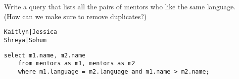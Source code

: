 \begin{blocksection}
\question Write a query that lists all the pairs of mentors who like the same language. (How can we make sure to remove duplicates?)

\begin{lstlisting}
Kaitlyn|Jessica
Shreya|Sohum
\end{lstlisting}

\begin{solution}[1in]
\begin{lstlisting}
select m1.name, m2.name
    from mentors as m1, mentors as m2
    where m1.language = m2.language and m1.name > m2.name;
\end{lstlisting}
\end{solution}
\end{blocksection}
